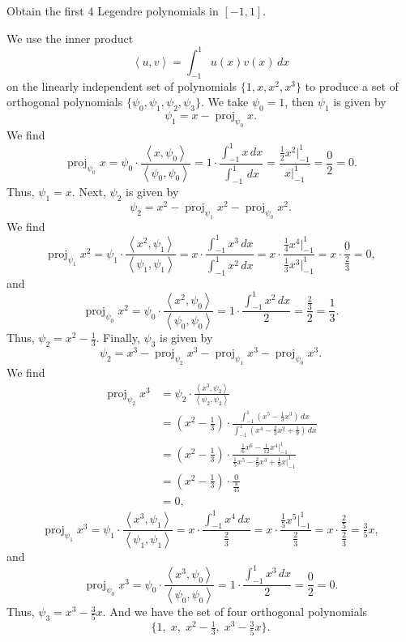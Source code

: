 \documentclass[12pt]{article}
\newenvironment{problem}
    {\begin{lrbox}{\mybox}\begin{minipage}{0.98\textwidth}}
    {\end{minipage}\end{lrbox}\framebox[\textwidth]{\usebox{\mybox}}}
\newcommand{\<}{\left\langle}
\renewcommand{\>}{\right\rangle}
\newcommand{\proj}{\operatorname{proj}}
\begin{document}
\newpage
\section{}

\subsection{}
\begin{problem}
    Obtain the first $4$ Legendre polynomials in $[-1, 1]$.
\end{problem}
\medskip

We use the inner product
\[
    \<u, v\> = \int_{-1}^1 u(x) v(x) \,dx
\]
on the linearly independent set of polynomials $\{1, x, x^2, x^3\}$ to produce a set of orthogonal polynomials $\{\psi_0, \psi_1, \psi_2, \psi_3\}$. We take $\psi_0 = 1$, then $\psi_1$ is given by
\[
    \psi_1 = x - \proj_{\psi_0} x.
\]
We find
\[
    \proj_{\psi_0} x 
        = \psi_0 \cdot \frac{\< x, \psi_0\>}{\<\psi_0, \psi_0\>}
        = 1 \cdot \frac{\int_{-1}^1 x \,dx}{\int_{-1}^1 \,dx}
        = \frac{\frac12 x^2 \big|_{-1}^1}{x \big|_{-1}^1}
        = \frac{0}{2}
        = 0.
\]
Thus, $\psi_1 = x$. Next, $\psi_2$ is given by
\[
    \psi_2 = x^2 - \proj_{\psi_1} x^2 - \proj_{\psi_0} x^2.
\]
We find
\[
    \proj_{\psi_1} x^2 
        = \psi_1 \cdot \frac{\< x^2, \psi_1\>}{\<\psi_1, \psi_1\>}
        = x \cdot \frac{\int_{-1}^1 x^3 \,dx}{\int_{-1}^1 x^2 \,dx}
        = x \cdot \frac{\frac14 x^4 \big|_{-1}^1}{\frac13 x^3 \big|_{-1}^1}
        = x \cdot \frac{0}{\frac23}
        = 0,
\]
and
\[
    \proj_{\psi_0} x^2 
        = \psi_0 \cdot \frac{\< x^2, \psi_0\>}{\<\psi_0, \psi_0\>}
        = 1 \cdot \frac{\int_{-1}^1 x^2 \,dx}{2}
        = \frac{\frac23}{2}
        = \frac13.
\]
Thus, $\psi_2 = x^2 - \frac13$. Finally, $\psi_3$ is given by
\[
    \psi_2 = x^3 - \proj_{\psi_2} x^3 - \proj_{\psi_1} x^3 - \proj_{\psi_0} x^3.
\]
We find
\begin{align*}
    \proj_{\psi_2} x^3 
        &= \psi_2 \cdot \frac{\< x^3, \psi_2\>}{\<\psi_2, \psi_2\>} \\
        &= (x^2 - \tfrac13) \cdot \frac{\int_{-1}^1 (x^5 - \frac13 x^3) \,dx}{\int_{-1}^1 (x^4 - \frac23 x^2 + \frac19) \,dx} \\
        &= (x^2 - \tfrac13)  \cdot \frac{\frac16 x^6 - \frac1{12} x^4 \big|_{-1}^1}{\frac15 x^5 - \frac29 x^3 + \frac19 x \big|_{-1}^1} \\
        &= (x^2 - \tfrac13)  \cdot \frac{0}{\frac8{45}} \\
        &= 0,
\end{align*}
\[
    \proj_{\psi_1} x^3 
        = \psi_1 \cdot \frac{\< x^3, \psi_1\>}{\<\psi_1, \psi_1\>}
        = x \cdot \frac{\int_{-1}^1 x^4 \,dx}{\frac23}
        = x \cdot \frac{\frac15 x^5 \big|_{-1}^1}{\frac23}
        = x \cdot \frac{\frac25}{\frac23}
        = \tfrac35 x,
\]
and
\[
    \proj_{\psi_0} x^3 
        = \psi_0 \cdot \frac{\< x^3, \psi_0\>}{\<\psi_0, \psi_0\>}
        = 1 \cdot \frac{\int_{-1}^1 x^3 \,dx}{2}
        = \frac{0}{2}
        = 0.
\]
Thus, $\psi_3 = x^3 - \frac35 x$. And we have the set of four orthogonal polynomials
\[
    \{1,\; x,\; x^2 - \tfrac13,\; x^3 - \tfrac35x\}.
\]
\end{document}
